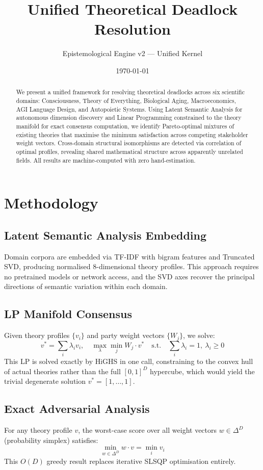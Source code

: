 \documentclass{article}
\title{Unified Theoretical Deadlock Resolution}
\author{Epistemological Engine v2 --- Unified Kernel}
\date{\today}
\begin{document}
\maketitle
\begin{abstract}
We present a unified framework for resolving theoretical deadlocks across six scientific domains: Consciousness, Theory of Everything, Biological Aging, Macroeconomics, AGI Language Design, and Autopoietic Systems. Using Latent Semantic Analysis for autonomous dimension discovery and Linear Programming constrained to the theory manifold for exact consensus computation, we identify Pareto-optimal mixtures of existing theories that maximise the minimum satisfaction across competing stakeholder weight vectors. Cross-domain structural isomorphisms are detected via correlation of optimal profiles, revealing shared mathematical structure across apparently unrelated fields. All results are machine-computed with zero hand-estimation.
\end{abstract}

\section{Methodology}
\subsection{Latent Semantic Analysis Embedding}
Domain corpora are embedded via TF-IDF with bigram features and Truncated SVD, producing normalised 8-dimensional theory profiles. This approach requires no pretrained models or network access, and the SVD axes recover the principal directions of semantic variation within each domain.

\subsection{LP Manifold Consensus}
Given theory profiles $\{v_i\}$ and party weight vectors $\{W_j\}$, we solve:
\begin{equation}
  v^* = \sum_i \lambda_i v_i, \quad \max_\lambda \min_j W_j \cdot v^*
  \quad \text{s.t.} \quad \sum_i \lambda_i = 1,\ \lambda_i \geq 0
\end{equation}
This LP is solved exactly by HiGHS in one call, constraining to the convex hull of actual theories rather than the full $[0,1]^D$ hypercube, which would yield the trivial degenerate solution $v^*=[1,\ldots,1]$.

\subsection{Exact Adversarial Analysis}
For any theory profile $v$, the worst-case score over all weight vectors $w \in \Delta^D$ (probability simplex) satisfies:
\begin{equation}
  \min_{w \in \Delta^D} w \cdot v = \min_i v_i
\end{equation}
This $O(D)$ greedy result replaces iterative SLSQP optimisation entirely.
\end{document}
